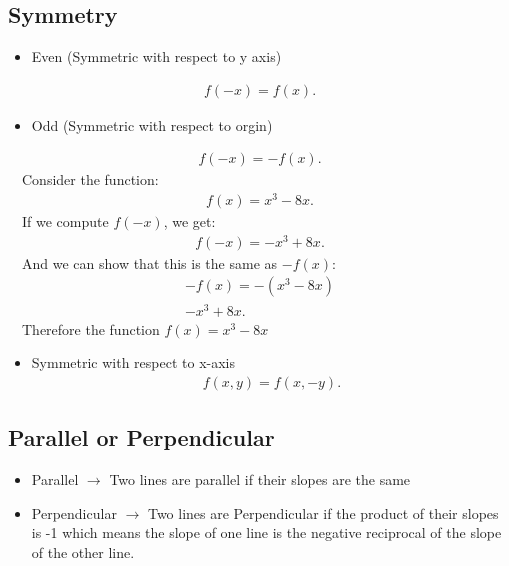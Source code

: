 \documentclass{report}
\begin{document}
    \bigbreak \noindent \bigbreak \noindent
    \subsection{Symmetry}
      \begin{itemize}
        \item Even (Symmetric with respect to y axis)
      \end{itemize}
        \begin{align*}
          f(-x) = f(x)
        .\end{align*}

      \begin{itemize}
        \item Odd (Symmetric with respect to orgin)
      \end{itemize}
        \begin{align*}
          f(-x) = -f(x)
        .\end{align*}
        \bigbreak \noindent   
        \quad \ \ Consider the function:
        \begin{align*}
          f(x) = x^{3} - 8x
        .\end{align*}
        \quad \ \ If we compute $f(-x)$, we get:
        \begin{align*}
          f(-x) = -x^{3} + 8x
        .\end{align*}
        \quad \ \ And we can show that this is the same as $-f(x)$:
        \begin{align*}
          -f(x) = -(x^{3} - 8x) \\
          -x^{3} +8x
        .\end{align*}
        \quad \ \ Therefore the function $f(x) = x^{3} - 8x$
        \bigbreak \noindent 
        \bigbreak \noindent 
      \begin{itemize}
        \item Symmetric with respect to x-axis
          \begin{align*}
            f(x,y) = f(x,-y)
          .\end{align*}
      \end{itemize}




      \bigbreak \noindent \bigbreak \noindent
      \subsection{Parallel or Perpendicular}
      \begin{itemize}
        \item Parallel $\rightarrow$ Two lines are parallel if their slopes are the same 
        \item Perpendicular $\rightarrow$ Two lines are Perpendicular if the product of their slopes is -1 which means the slope of one line is the negative reciprocal of the slope of the other line.
      \end{itemize}
\end{document}
